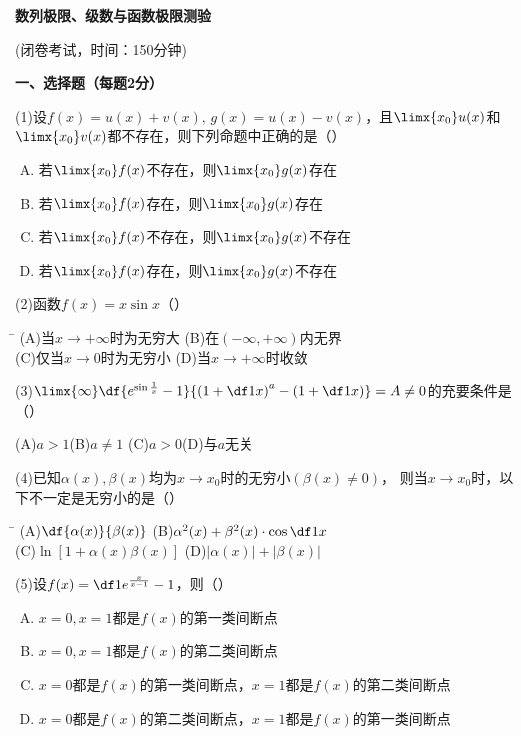 \begin{center}
	{\Large\bf 数列极限、级数与函数极限测验}
	
	(闭卷考试，时间：150分钟)
\end{center}

{\bf 一、选择题（每题2分）}

(1)\;设$f(x)=u(x)+v(x),\,g(x)=u(x)-v(x)$，且$\limx{x_0}u(x)$和
$\limx{x_0}v(x)$都不存在，则下列命题中正确的是（\quad）%
\begin{enumerate}[(A)]
  \setlength{\itemindent}{1cm}
  \item 若$\limx{x_0}f(x)$不存在，则$\limx{x_0}g(x)$存在
  \item 若$\limx{x_0}f(x)$存在，则$\limx{x_0}g(x)$存在
  \item 若$\limx{x_0}f(x)$不存在，则$\limx{x_0}g(x)$不存在
  \item 若$\limx{x_0}f(x)$存在，则$\limx{x_0}g(x)$不存在
\end{enumerate}

(2)\;函数$f(x)=x\sin x$（\quad）%
\begin{tabbing}
	\hspace{8cm}\=\kill
	\quad\quad\quad(A)\;当$x\to+\infty$时为无穷大 \> 
	(B)\;在$(-\infty,+\infty)$内无界 \\ 
	\quad\quad\quad(C)\;仅当$x\to0$时为无穷小\>
	(D)\;当$x\to+\infty$时收敛
\end{tabbing}

(3)\;$\limx{\infty}\df{e^{\sin\frac1x}-1}{\left(1+\df1x\right)^a
-\left(1+\df1x\right)}=A\ne 0$的充要条件是（\quad）%

\quad (A)\;$a>1$\quad\quad\quad(B)\;$a\ne 1$
\quad\quad\quad (C)\;$a>0$\quad\quad\quad(D)\;与$a$无关

(4)\;已知$\alpha(x),\beta(x)$均为$x\to x_0$时的无穷小$(\beta(x)\ne0)$，
则当$x\to x_0$时，以下不一定是无穷小的是（\quad）%

\begin{tabbing}
	\hspace{8cm}\=\kill
	\quad\quad\quad(A)\;$\df{\alpha(x)}{\beta(x)}$ \> 
	(B)\;$\alpha^2(x)+\beta^2(x)\cdot\cos\df1x$ \\ 
	\quad\quad\quad(C)\;$\ln[1+\alpha(x)\beta(x)]$\>
	(D)\;$|\alpha(x)|+|\beta(x)|$ 
\end{tabbing}

(5)\;设$f(x)=\df1{e^{\frac{x}{x-1}}-1}$，则（\quad）%
\begin{enumerate}[(A)]
  \setlength{\itemindent}{1cm}
  \item $x=0,x=1$都是$f(x)$的第一类间断点
  \item $x=0,x=1$都是$f(x)$的第二类间断点
  \item $x=0$都是$f(x)$的第一类间断点，$x=1$都是$f(x)$的第二类间断点
  \item $x=0$都是$f(x)$的第二类间断点，$x=1$都是$f(x)$的第一类间断点
\end{enumerate}

